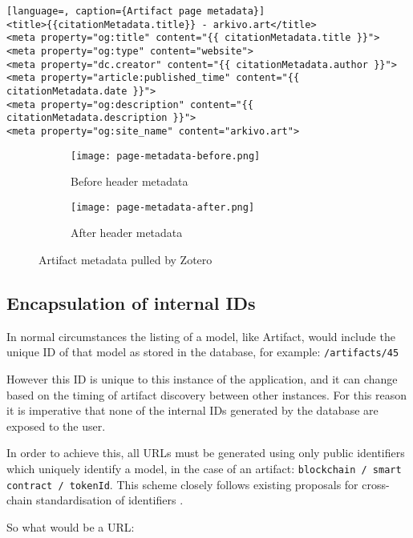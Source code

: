 \begin{lstlisting}[language=, caption={Artifact page metadata}] 
<title>{{citationMetadata.title}} - arkivo.art</title>
<meta property="og:title" content="{{ citationMetadata.title }}">
<meta property="og:type" content="website">
<meta property="dc.creator" content="{{ citationMetadata.author }}">
<meta property="article:published_time" content="{{ citationMetadata.date }}">
<meta property="og:description" content="{{ citationMetadata.description }}">
<meta property="og:site_name" content="arkivo.art">
\end{lstlisting}


\begin{figure}[H]
  \centering
  \begin{subfigure}[b]{0.45\textwidth}
    \centering
    \texttt{[image: page-metadata-before.png]}
    \caption{Before header metadata}
    \label{fig:image1}
  \end{subfigure}
  \hfill
  \begin{subfigure}[b]{0.45\textwidth}
    \centering
    \texttt{[image: page-metadata-after.png]}
    \caption{After header metadata}
    \label{fig:image2}
  \end{subfigure}
  \caption{Artifact metadata pulled by Zotero}
  \label{fig:zotero-metadata-comparison}
\end{figure}


\subsection{Encapsulation of internal IDs}

In normal circumstances the listing of a model, like Artifact, would include the unique ID of that model as stored in the database, for example: \texttt{/artifacts/45}

However this ID is unique to this instance of the application, and it can change based on the timing of artifact discovery between other instances.
For this reason it is imperative that none of the internal IDs generated by the database are exposed to the user.

In order to achieve this, all URLs must be generated using only public identifiers which uniquely identify a model, in the case of an artifact: \texttt{blockchain /  smart contract / tokenId}.
This scheme closely follows existing proposals for cross-chain standardisation of identifiers \cite{herzogAssetTypeAsset2020}.

So what would be a URL:


